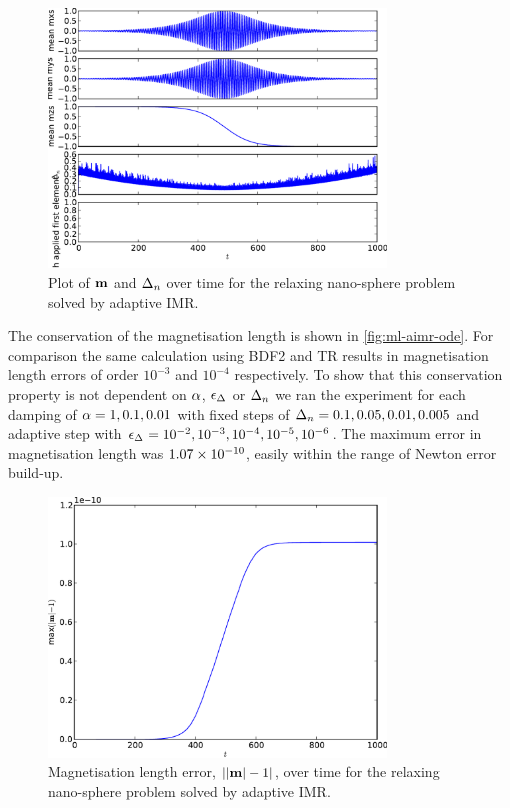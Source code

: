 \begin{figure}[tbp]
  \centering
 \includegraphics[width=0.8\textwidth]{plots/aimr-sphere-relax/meanmxsvs-meanmysvs-meanmzsvs-dtsvs-happliedfirstelementvstimes.pdf}
 \caption{Plot of $\mathbf{m}$ and $\Delta_{n}$ over time for the relaxing nano-sphere problem solved by adaptive IMR.}
  \label{fig:imr-llg-ode}
\end{figure}

The conservation of the magnetisation length is shown in \autoref{fig:ml-aimr-ode}.
For comparison the same calculation using BDF2 and TR results in magnetisation length errors of order $10^{-3}$ and $10^{-4}$ respectively.
To show that this conservation property is not dependent on $\alpha$, $\epsilon_{\Delta_{}}$ or $\Delta_{n}$ we ran the experiment for each damping of $\alpha= 1, 0.1, 0.01$ with fixed steps of $\Delta_{n}=0.1, 0.05, 0.01, 0.005$ and adaptive step with $\epsilon_{\Delta_{}} =10^{-2}, 10^{-3}, 10^{-4}, 10^{-5}, 10^{-6}$. 
The maximum error in magnetisation length was $1.07\times 10^{-10}$, easily within the range of Newton error build-up.

\begin{figure}[tbp]
  \centering
  \includegraphics[width=0.8\textwidth]{plots/aimr-sphere-relax/mlengtherrormaxesvstimes.pdf}
  \caption{Magnetisation length error, $\left|{\left|{\mathbf{m}} \right| -1} \right|$, over time for the relaxing nano-sphere problem solved by adaptive IMR.}
  \label{fig:ml-aimr-ode}
\end{figure}

